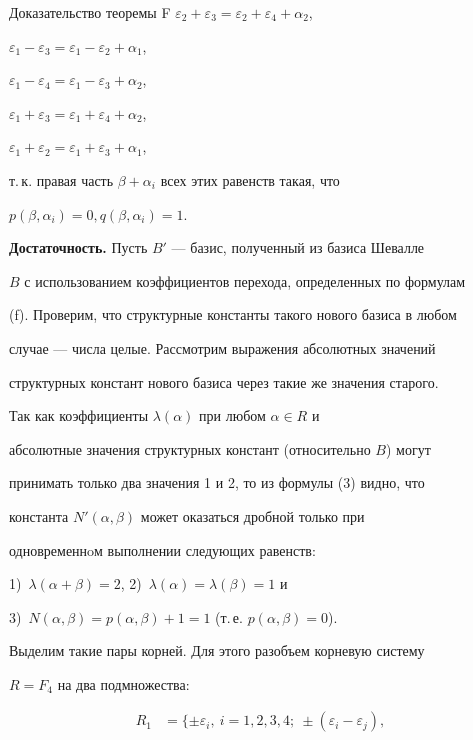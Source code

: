 \begin{pf*}{Доказательство теоремы F}
$\varepsilon_2+\varepsilon_3=\varepsilon_2+\varepsilon_4+\alpha_2$,


$\varepsilon_1-\varepsilon_3=\varepsilon_1-\varepsilon_2+\alpha_1$,


$\varepsilon_1-\varepsilon_4=\varepsilon_1-\varepsilon_3+\alpha_2$,


$\varepsilon_1+\varepsilon_3=\varepsilon_1+\varepsilon_4+\alpha_2$,


$\varepsilon_1+\varepsilon_2=\varepsilon_1+\varepsilon_3+\alpha_1$,


т.\,к. правая часть $\beta+\alpha_i$ всех этих равенств такая, что


$p(\beta,\alpha_i)=0,q(\beta,\alpha_i)=1$.


\medskip





{\bf Достаточность.} Пусть $B'$ --- базис, полученный из базиса Шевалле


$B$ с использованием коэффициентов перехода, определенных по формулам


(f). Проверим, что структурные константы такого нового базиса в любом


случае --- числа целые. Рассмотрим выражения абсолютных значений


структурных констант нового базиса через такие же значения старого.


Так как коэффициенты $\lambda(\alpha)$ при любом $\alpha\in R$ и


абсолютные значения структурных констант (относительно $B$) могут


принимать только два значения 1 и 2, то из формулы (3) видно, что


константа $N'(\alpha,\beta)$ может оказаться дробной только при


одновременнoм выполнении следующих равенств:


1)~$\lambda(\alpha+\beta)=2$, 2)~$\lambda(\alpha)=\lambda(\beta)=1$ и


3)~$N(\alpha,\beta)=p(\alpha,\beta)+1=1$ (т.\,е. $p(\alpha,\beta)=0$).





Выделим такие пары корней. Для этого разобъем корневую систему


$R=F_4$ на два подмножества:


\begin{align*}


R_1&=\{\pm\varepsilon_i,\ i=1,2,3,4;\ \pm(\varepsilon_i-\varepsilon_j),



\end{align*}
\end{pf*}
